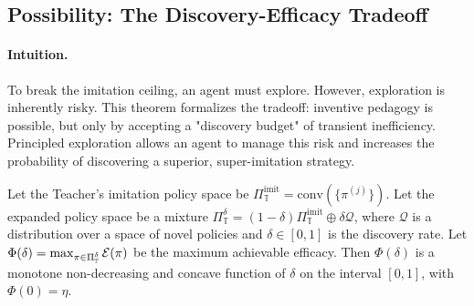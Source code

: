 \subsection{Possibility: The Discovery-Efficacy Tradeoff}
\paragraph{Intuition.} To break the imitation ceiling, an agent must explore. However, exploration is inherently risky. This theorem formalizes the tradeoff: inventive pedagogy is possible, but only by accepting a "discovery budget" of transient inefficiency. Principled exploration allows an agent to manage this risk and increases the probability of discovering a superior, super-imitation strategy.

\begin{theorem}
\label{thm:tradeoff}
Let the Teacher's imitation policy space be $\Pi_{\mathbb{T}}^{\text{imit}} = \text{conv}(\{\pi^{(j)}\})$. Let the expanded policy space be a mixture $\Pi_{\mathbb{T}}^\delta = (1-\delta)\Pi_{\mathbb{T}}^{\text{imit}} \oplus \delta \mathcal{Q}$, where $\mathcal{Q}$ is a distribution over a space of novel policies and $\delta \in [0, 1]$ is the discovery rate. Let $\Phi(\delta) = \max_{\pi \in \Pi_{\mathbb{T}}^\delta} \mathcal{E}(\pi)$ be the maximum achievable efficacy. Then $\Phi(\delta)$ is a monotone non-decreasing and concave function of $\delta$ on the interval $[0, 1]$, with $\Phi(0)=\eta$.
\end{theorem}
